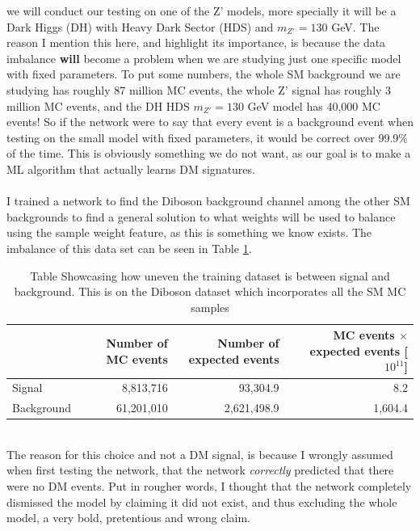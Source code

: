 \documentclass[14pt, a4paper]{book}
\begin{document}
we will conduct our testing on one of the Z' models, more specially it will be a Dark Higgs (DH) with Heavy Dark Sector (HDS) and $m_{Z'}=130$ GeV. The reason I mention this here, and highlight its importance, is because 
the data imbalance \textbf{will} become a problem when we are studying just one specific model with fixed parameters. To put some numbers, the whole SM background we are studying has roughly 87 million MC events, 
the whole Z' signal has roughly 3 million MC events, and the DH HDS $m_{Z'} = 130$ GeV model has 40,000 MC events! So if the network were to say that every event is a background event when testing on the small model with fixed parameters, 
it would be correct over 99.9\% of the time. This is obviously something we do not want, as our goal is to make a ML algorithm that actually learns DM signatures.\\
\\I trained a network to find the Diboson background channel among the other SM backgrounds to find a general solution to what weights will be used to balance using the sample weight feature, as this is something we know exists. 
The imbalance of this data set can be seen in Table \ref{tab:UnbalancedDibosonTraining}.
\begin{table}[!h]
   \centering
   \begin{tabular}{l|r|r|r}\midrule\midrule
                   & Number of MC events  & Number of expected events   & MC events $\times$ expected events [$10^{11}$]\\\midrule
        Signal     & 8,813,716            & 93,304.9                    & 8.2\\
        Background & 61,201,010           & 2,621,498.9                 & 1,604.4 \\ \midrule\midrule
   \end{tabular}
   \caption[Unbalanced Diboson training dataset]{Table Showcasing how uneven the training dataset is between signal and background. This is on the Diboson dataset which incorporates all the SM MC samples}
   \label{tab:UnbalancedDibosonTraining}
\end{table}
\\The reason for this choice and not a DM signal, is because I wrongly assumed when first testing the network, that the network \textit{correctly} predicted that there were no DM events. 
Put in rougher words, I thought that the network completely dismissed the model by claiming it did not exist, and thus excluding the whole model, a very bold, pretentious and wrong claim. 
\end{document}
